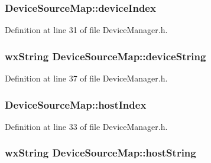 \subsubsection[{\texorpdfstring{device\+Index}{deviceIndex}}]{ Device\+Source\+Map\+::device\+Index}\hypertarget{struct_device_source_map_ac3627f0989e6875e621ff9551797cba4}{}\label{struct_device_source_map_ac3627f0989e6875e621ff9551797cba4}


Definition at line 31 of file Device\+Manager.\+h.

\subsubsection[{\texorpdfstring{device\+String}{deviceString}}]{\setlength{\rightskip}{0pt plus 5cm}wx\+String Device\+Source\+Map\+::device\+String}\hypertarget{struct_device_source_map_af4ee803ca01c0a420a2af321a10be103}{}\label{struct_device_source_map_af4ee803ca01c0a420a2af321a10be103}


Definition at line 37 of file Device\+Manager.\+h.

\subsubsection[{\texorpdfstring{host\+Index}{hostIndex}}]{ Device\+Source\+Map\+::host\+Index}\hypertarget{struct_device_source_map_a936cec62411bfe3e148c0f4a76a49060}{}\label{struct_device_source_map_a936cec62411bfe3e148c0f4a76a49060}


Definition at line 33 of file Device\+Manager.\+h.

\subsubsection[{\texorpdfstring{host\+String}{hostString}}]{\setlength{\rightskip}{0pt plus 5cm}wx\+String Device\+Source\+Map\+::host\+String}\hypertarget{struct_device_source_map_a13c9083502eb1ea0866a56679f118071}{}\label{struct_device_source_map_a13c9083502eb1ea0866a56679f118071}


